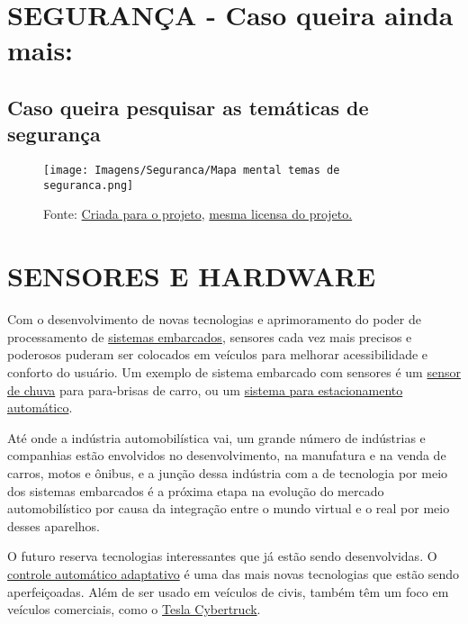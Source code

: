 \documentclass{article}
\begin{document}
\newpage

\section*{SEGURANÇA - Caso queira ainda mais:}
\subsection*{Caso queira pesquisar as temáticas de segurança}


\begin{figure}[ht]
    \centering
    \texttt{[image: Imagens/Seguranca/Mapa mental temas de seguranca.png]}
    \caption{Fonte: \href{https://github.com/solid-titans/LDO-Embarcados-Veiculares}{Criada para o projeto}, \href{https://github.com/solid-titans/LDO-Embarcados-Veiculares/blob/main/LICENSE}{mesma licensa do projeto.}}
\end{figure}


\newpage


\section*{SENSORES E HARDWARE}

\hspace{4pt} Com o desenvolvimento de novas tecnologias e aprimoramento do poder de processamento de \href{https://pt.wikipedia.org/wiki/Sistema_embarcado}{sistemas embarcados}, sensores cada vez mais precisos e poderosos puderam ser colocados em veículos para melhorar acessibilidade e conforto do usuário. Um exemplo de sistema embarcado com sensores é um \href{https://www.youtube.com/watch?v=AxapuVgepV8}{sensor de chuva} para para-brisas de carro, ou um \href{https://www.youtube.com/watch?v=EppMSSYBOm0}{sistema para estacionamento automático}. 

Até onde a indústria automobilística vai, um grande número de indústrias e companhias estão envolvidos no desenvolvimento, na manufatura e na venda de carros, motos e ônibus, e a junção dessa indústria com a de tecnologia por meio dos sistemas embarcados é a próxima etapa na evolução  do mercado automobilístico por causa da integração entre o mundo virtual e o real por meio desses aparelhos.

O futuro reserva tecnologias interessantes que já estão sendo desenvolvidas. O \href{https://www.youtube.com/watch?v=j7XKgLtTN2o}{controle automático adaptativo} é uma das mais novas tecnologias que estão sendo aperfeiçoadas. Além de ser usado em veículos de civis, também têm um foco em veículos comerciais, como o \href{https://external-content.duckduckgo.com/iu/?u=https%3A%2F%2Fcdn.cnn.com%2Fcnnnext%2Fdam%2Fassets%2F191121212606-tesla-cybertruck-exlarge-169.jpg&f=1&nofb=1}{Tesla Cybertruck}.
\end{document}
